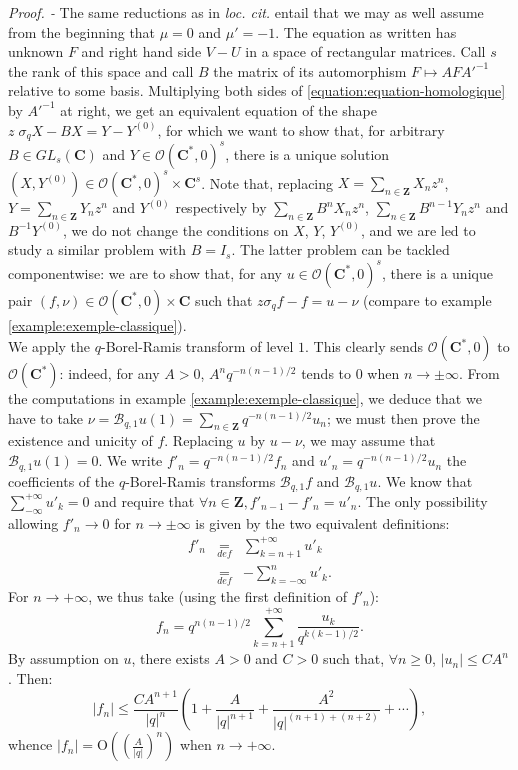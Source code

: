 \documentclass[english]{smfart}
\numberwithin{equation}{thm}
\def \Pr {\textsl{Proof. - }}
\def\sq{\sigma_q}
\def\C{{\mathbf C}}
\def\Z{{\mathbf Z}}
\def\B{{\mathcal{B}}}
\def\Rw{{\mathcal{O}(\C^{*})}}
\def\Rwg{{\mathcal{O}(\C^{*},0)}}
\begin{document}
\Pr 
The same reductions as in \emph{loc. cit.} entail that we may as well 
assume from the beginning that $\mu = 0$ and $\mu' = -1$. 
The equation as written has unknown $F$ and right hand side $V - U$
in a space of rectangular matrices. Call $s$ the rank of this space 
and call $B$ the matrix of its automorphism $F \mapsto A F {A'}^{-1}$ 
relative to some basis. 
Multiplying both sides of \ref{equation:equation-homologique}
by ${A'}^{-1}$ at right, we get an equivalent equation of the shape
$z \; \sq X - B X = Y - Y^{(0)}$, for which we want to show that, 
for arbitrary $B \in GL_{s}(\C)$ and $Y \in \Rwg^{s}$, there is 
a unique solution $(X,Y^{(0)}) \in \Rwg^{s} \times \C^{s}$. 
Note that, replacing
$X = \sum_{n \in \Z} X_{n} z^{n}$, $Y = \sum_{n \in \Z} Y_{n} z^{n}$
and $Y^{(0)}$ respectively by $\sum_{n \in \Z} B^{n} X_{n} z^{n}$, 
$\sum_{n \in \Z} B^{n-1} Y_{n} z^{n}$ and $B^{-1}Y^{(0)}$,
we do not change the conditions on $X$, $Y$, $Y^{(0)}$, and we
are led to study a similar problem with $B = I_{s}$. The latter
problem can be tackled componentwise: we are to show that, for
any $u \in \Rwg^{s}$, there is a unique pair 
$(f,\nu) \in  \Rwg \times \C$ such that $z \sq f - f = u - \nu$
(compare to example \ref{example:exemple-classique}). \\

We apply the $q$-Borel-Ramis transform of level $1$. This clearly sends
$\Rwg$ to $\Rw$: indeed, for any $A > 0$, $A^{n} q^{-n(n-1)/2}$ tends
to $0$ when $n \to \pm \infty$. From the computations in example
\ref{example:exemple-classique}, we deduce that we have to take
$\nu = \B_{q,1} u (1) = \sum_{n \in \Z} q^{-n(n-1)/2} u_{n}$;
we must then prove the existence and unicity of $f$. Replacing $u$
by $u - \nu$, we may assume that $\B_{q,1} u (1) = 0$. 
We write $f'_{n} = q^{-n(n-1)/2} f_{n}$ and $u'_{n} = q^{-n(n-1)/2} u_{n}$
the coefficients of the $q$-Borel-Ramis transforms $\B_{q,1} f$ and
$\B_{q,1} u$. We know that $\sum_{-\infty}^{+\infty} u'_{k} = 0$ and
require that $\forall n \in \Z, f'_{n-1} - f'_{n} = u'_{n}$.
The only possibility allowing $f'_{n} \to 0$ for $n \to \pm \infty$
is given by the two equivalent definitions:
\begin{eqnarray*}
f'_{n} & \underset{def}{=} & \sum_{k = n+1}^{+ \infty} u'_{k} \\
       & \underset{def}{=} & - \sum_{k = -\infty}^{n} u'_{k}.
\end{eqnarray*}
For $n \to + \infty$, we thus take (using the first definition of $f'_{n}$):
$$
f_{n} = q^{n(n-1)/2} \sum_{k = n+1}^{+ \infty} \frac{u_{k}}{q^{k(k-1)/2}}.
$$
By assumption on $u$, there exists $A > 0$ and $C > 0$ such that,
$\forall n \geq 0$, $\left|u_{n}\right| \leq C A^{n}$. Then:
$$
\left|f_{n}\right| \leq \frac{C A^{n+1}}{\left|q\right|^{n}}
\left(
1 + \frac{A}{\left|q\right|^{n+1}} + 
\frac{A^{2}}{\left|q\right|^{(n+1) + (n+2)}} + \cdots
\right),
$$
whence 
$\left|f_{n}\right| = 
\text{O}\left(
\left(\frac{A}{\left|q\right|}\right)^{n}
\right)$
when $n \to + \infty$. \\
\end{document}
